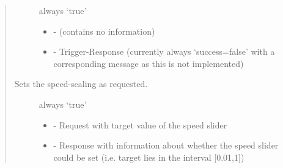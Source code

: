 \documentclass[letterpaper,10pt,english]{sphinxmanual}
\begin{document}
\begin{quote}
\begin{fulllineitems}
\begin{fulllineitems}
\begin{description}
\item[{}] \leavevmode

always ‘true’ 


\item[{}] \leavevmode\begin{itemize}
\item {}  - 
(contains no information) 

\item {}  - 
Trigger-Response (currently always ‘success=false’ with a corresponding message as this is not implemented) 

\end{itemize}

\end{description}


\end{fulllineitems}


\begin{fulllineitems}
\label{\detokenize{HardwareInterface:_CPPv2N21coppeliasim_interface17HardwareInterface14setSpeedSliderERN7ur_msgs29SetSpeedSliderFractionRequestERN7ur_msgs30SetSpeedSliderFractionResponseE}}%
\pysigstartmultiline
{}\label{\detokenize{HardwareInterface:project0classcoppeliasim__interface_1_1HardwareInterface_1a0fb3b4bf382fc390db4d8c40036a683b}}%
\pysigstopmultiline
Sets the speed-scaling as requested. 

\begin{description}
\item[{}] \leavevmode

always ‘true’ 


\item[{}] \leavevmode\begin{itemize}
\item {}  - 
Request with target value of the speed slider 

\item {}  - 
Response with information about whether the speed slider could be set (i.e. target lies in the interval {[}0.01,1{]}) 


\end{itemize}
\end{description}
\end{fulllineitems}
\end{fulllineitems}
\end{quote}
\end{document}
